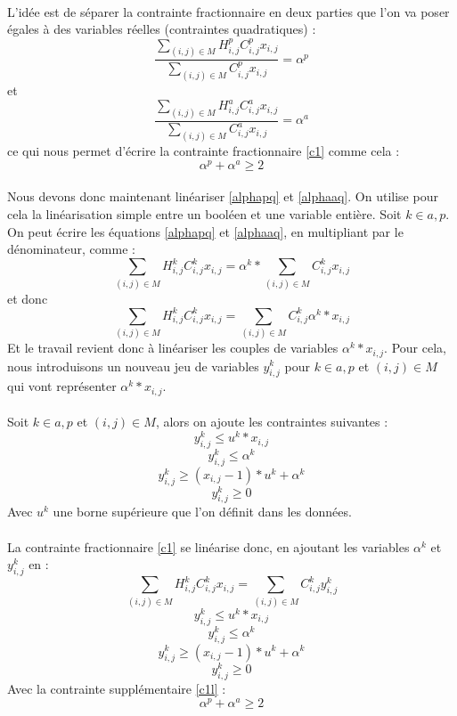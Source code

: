 \documentclass[a4paper, 11pt]{article} %
\begin{document}
\paragraph*{}
L'idée est de séparer la contrainte fractionnaire en deux parties que l'on va poser égales à des variables réelles (contraintes quadratiques) : 
\begin{equation}  
  \frac{\sum_{(i,j)\in M} H_{i,j}^p C_{i,j}^p x_{i,j}}{\sum_{(i,j)\in M} C_{i,j}^p x_{i,j}} = \alpha^p
\label{alphapq}
\end{equation}
et
\begin{equation}  
  \frac{\sum_{(i,j)\in M} H_{i,j}^a C_{i,j}^a x_{i,j}}{\sum_{(i,j)\in M} C_{i,j}^a x_{i,j}} = \alpha^a
\label{alphaaq}
\end{equation} 
ce qui nous permet d'écrire la contrainte fractionnaire \eqref{c1} comme cela :
\begin{equation}  
  \alpha^p + \alpha^a \geq 2
\label{c1l}
\end{equation}  

\paragraph*{}
Nous devons donc maintenant linéariser \eqref{alphapq} et \eqref{alphaaq}. On utilise pour cela la linéarisation simple entre un booléen et une variable entière. Soit $k \in {a,p}$. On peut écrire les équations \eqref{alphapq} et \eqref{alphaaq}, en multipliant par le dénominateur, comme : 
$$
  \sum_{(i,j)\in M} H_{i,j}^k C_{i,j}^k x_{i,j} = \alpha^k * \sum_{(i,j)\in M} C_{i,j}^k x_{i,j}
$$
et donc 
$$
  \sum_{(i,j)\in M} H_{i,j}^k C_{i,j}^k x_{i,j} = \sum_{(i,j)\in M} C_{i,j}^k \alpha^k * x_{i,j} 
$$
Et le travail revient donc à linéariser les couples de variables $ \alpha^k * x_{i,j} $. Pour cela, nous introduisons un nouveau jeu de variables $y_{i,j}^k$ pour $k \in {a,p}$ et $(i,j)\in M$ qui vont représenter $ \alpha^k * x_{i,j} $.

\paragraph*{}
Soit $k \in {a,p}$ et $(i,j)\in M$, alors on ajoute les contraintes suivantes :
$$ 
  y_{i,j}^k \leq u^k * x_{i,j} 
$$
$$
  y_{i,j}^k \leq \alpha^k 
$$
$$
  y_{i,j}^k \geq (x_{i,j}-1)*u^k + \alpha^k 
$$
$$
  y_{i,j}^k \geq 0 
$$
Avec $u^k$ une borne supérieure que l'on définit dans les données.

\paragraph*{}
La contrainte fractionnaire \eqref{c1} se linéarise donc, en ajoutant les variables $\alpha^k$ et $y_{i,j}^k$ en : 
$$
  \sum_{(i,j)\in M} H_{i,j}^k C_{i,j}^k x_{i,j} = \sum_{(i,j)\in M} C_{i,j}^k y_{i,j}^k 
$$
$$ 
  y_{i,j}^k \leq u^k * x_{i,j} 
$$
$$
  y_{i,j}^k \leq \alpha^k 
$$
$$
  y_{i,j}^k \geq (x_{i,j}-1)*u^k + \alpha^k 
$$
$$
  y_{i,j}^k \geq 0 
$$
Avec la contrainte supplémentaire \eqref{c1l} :
$$ 
  \alpha^p + \alpha^a \geq 2
$$
\end{document}
